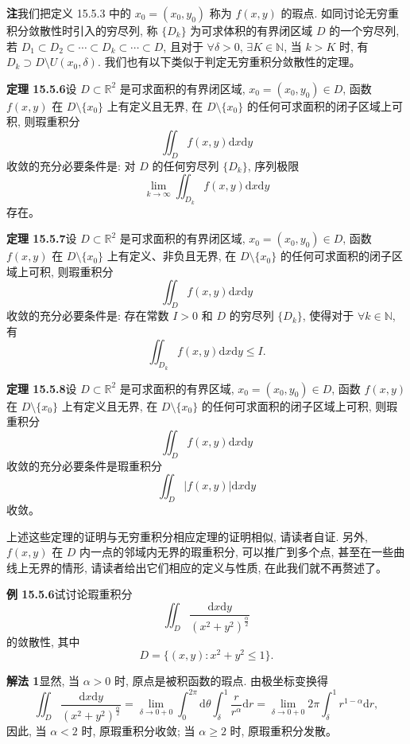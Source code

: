 \documentclass[UTF8, 12pt, fontset=fandol, oneside]{ctexart}
\begin{document}
\noindent\textbf{注}\quad 我们把定义 15.5.3 中的 $x_0=(x_0,y_0)$ 称为 $f(x,y)$ 的瑕点. 如同讨论无穷重积分敛散性时引入的穷尽列, 称 $\{D_k\}$ 为可求体积的有界闭区域 $D$ 的一个穷尽列, 若 $D_1\subset D_2\subset\cdots\subset D_k\subset\cdots\subset D$, 且对于 $\forall\delta>0$, $\exists K\in\mathbb N$, 当 $k>K$ 时, 有 $D_k\supset D\setminus U(x_0,\delta)$. 我们也有以下类似于判定无穷重积分敛散性的定理。

\noindent\textbf{定理 15.5.6}\quad 设 $D\subset\mathbb R^2$ 是可求面积的有界闭区域, $x_0=(x_0,y_0)\in D$, 函数 $f(x,y)$ 在 $D\setminus\{x_0\}$ 上有定义且无界, 在 $D\setminus\{x_0\}$ 的任何可求面积的闭子区域上可积, 则瑕重积分
\[
  \iint_D f(x,y)\mathrm dx\mathrm dy
\]
收敛的充分必要条件是: 对 $D$ 的任何穷尽列 $\{D_k\}$, 序列极限
\[
  \lim_{k\to\infty}\iint_{D_k}f(x,y)\mathrm dx\mathrm dy
\]
存在。

\noindent\textbf{定理 15.5.7}\quad 设 $D\subset\mathbb R^2$ 是可求面积的有界闭区域, $x_0=(x_0,y_0)\in D$, 函数 $f(x,y)$ 在 $D\setminus\{x_0\}$ 上有定义、非负且无界, 在 $D\setminus\{x_0\}$ 的任何可求面积的闭子区域上可积, 则瑕重积分
\[
  \iint_D f(x,y)\mathrm dx\mathrm dy
\]
收敛的充分必要条件是: 存在常数 $I>0$ 和 $D$ 的穷尽列 $\{D_k\}$, 使得对于 $\forall k\in\mathbb N$, 有
\[
  \iint_{D_k}f(x,y)\mathrm dx\mathrm dy\leqslant I.
\]

\noindent\textbf{定理 15.5.8}\quad 设 $D\subset\mathbb R^2$ 是可求面积的有界区域, $x_0=(x_0,y_0)\in D$, 函数 $f(x,y)$ 在 $D\setminus\{x_0\}$ 上有定义且无界, 在 $D\setminus\{x_0\}$ 的任何可求面积的闭子区域上可积, 则瑕重积分
\[
  \iint_D f(x,y)\mathrm dx\mathrm dy
\]
收敛的充分必要条件是瑕重积分
\[
  \iint_D |f(x,y)|\mathrm dx\mathrm dy
\]
收敛。

上述这些定理的证明与无穷重积分相应定理的证明相似, 请读者自证. 另外, $f(x,y)$ 在 $D$ 内一点的邻域内无界的瑕重积分, 可以推广到多个点, 甚至在一些曲线上无界的情形, 请读者给出它们相应的定义与性质, 在此我们就不再赘述了。

\noindent\textbf{例 15.5.6}\quad 试讨论瑕重积分
\[
  \iint_D\frac{\mathrm dx\mathrm dy}{(x^2+y^2)^{\frac\alpha2}}
\]
的敛散性, 其中
\[
  D=\{(x,y):x^2+y^2\leqslant1\}.
\]

\noindent\textbf{解法 1}\quad 显然, 当 $\alpha>0$ 时, 原点是被积函数的瑕点. 由极坐标变换得
\[
  \iint_D\frac{\mathrm dx\mathrm dy}{(x^2+y^2)^{\frac\alpha2}}
  =\lim_{\delta\to0+0}\int_0^{2\pi}\mathrm d\theta\int_\delta^1\frac r{r^\alpha}\mathrm dr
  =\lim_{\delta\to0+0}2\pi\int_\delta^1r^{1-\alpha}\mathrm dr,
\]
因此, 当 $\alpha<2$ 时, 原瑕重积分收敛; 当 $\alpha\geqslant2$ 时, 原瑕重积分发散。
\end{document}
